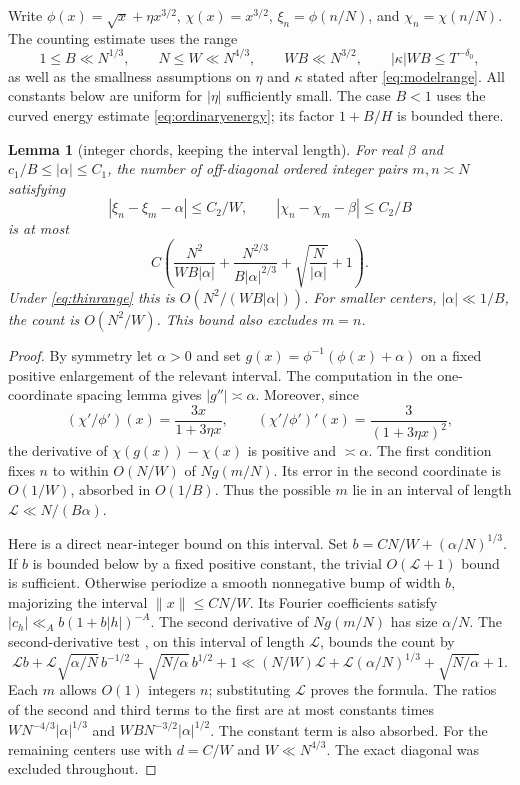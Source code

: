 \documentclass[11pt]{amsart}
\numberwithin{equation}{section}
\newtheorem{lemma}[theorem]{Lemma}
\begin{document}
Write $\phi(x)=\sqrt x+\eta x^{3/2}$, $\chi(x)=x^{3/2}$,
$\xi_n=\phi(n/N)$, and $\chi_n=\chi(n/N)$.
The counting estimate uses the range
\begin{equation}\label{eq:thinrange}
 1\le B\ll N^{1/3},\qquad N\le W\ll N^{4/3},\qquad
 WB\ll N^{3/2},\qquad |\kappa|WB\le T^{-\delta_0},
\end{equation}
as well as the smallness assumptions on $\eta$ and $\kappa$ stated after
\eqref{eq:modelrange}.
All constants below are uniform for $|\eta|$ sufficiently small.
The case $B<1$ uses the curved energy estimate
\eqref{eq:ordinaryenergy}; its factor $1+B/H$ is bounded there.

\begin{lemma}[integer chords, keeping the interval length]
\label{lem:chordreproof}
For real $\beta$ and $c_1/B\le|\alpha|\le C_1$, the number of off-diagonal ordered
integer pairs $m,n\asymp N$ satisfying
\[
 |\xi_n-\xi_m-\alpha|\le C_2/W,\qquad
 |\chi_n-\chi_m-\beta|\le C_2/B
\]
is at most
\[
 C\left(\frac{N^2}{WB|\alpha|}
       +\frac{N^{2/3}}{B|\alpha|^{2/3}}
       +\sqrt{\frac N{|\alpha|}}+1\right).
\]
Under \eqref{eq:thinrange} this is $O(N^2/(WB|\alpha|))$.
For smaller centers, $|\alpha|\ll1/B$, the count is $O(N^2/W)$.
This bound also excludes $m=n$.
\end{lemma}
\begin{proof}
By symmetry let $\alpha>0$ and set
$g(x)=\phi^{-1}(\phi(x)+\alpha)$ on a fixed positive enlargement
of the relevant interval. The computation in
the one-coordinate spacing lemma
\cite[Lemma~\ref*{six-lem:spacingproof}]{Weighted} gives $|g''|\asymp\alpha$.
Moreover, since
\[
 (\chi'/\phi')(x)=\frac{3x}{1+3\eta x},\qquad
 (\chi'/\phi')'(x)=\frac3{(1+3\eta x)^2},
\]
the derivative of $\chi(g(x))-\chi(x)$ is positive and
$\asymp\alpha$. The first condition fixes $n$ to within $O(N/W)$
of $Ng(m/N)$. Its error in the second coordinate is $O(1/W)$,
absorbed in $O(1/B)$. Thus the possible $m$ lie in an interval of
length $\mathcal L\ll N/(B\alpha)$.

Here is a direct near-integer bound on this interval. Set
$b=C N/W+(\alpha/N)^{1/3}$. If $b$ is bounded below by a fixed
positive constant, the trivial $O(\mathcal L+1)$ bound is sufficient.
Otherwise periodize a smooth nonnegative bump of width $b$, majorizing
the interval $\|x\|\le C N/W$. Its Fourier coefficients satisfy
$|c_h|\ll_A b(1+b|h|)^{-A}$. The second derivative of
$Ng(m/N)$ has size $\alpha/N$. The second-derivative test
\cite[Lemma~\ref*{six-lem:secondproof}]{Weighted}, on
this interval of length $\mathcal L$, bounds the count by
\[
 \mathcal L b+
 \mathcal L\sqrt{\alpha/N}\,b^{-1/2}
       +\sqrt{N/\alpha}\,b^{1/2}+1
 \ll (N/W)\mathcal L+\mathcal L(\alpha/N)^{1/3}
                       +\sqrt{N/\alpha}+1.
\]
Each $m$ allows $O(1)$ integers $n$; substituting $\mathcal L$ proves
the formula. The ratios of the second and third terms to the first
are at most constants times
$WN^{-4/3}|\alpha|^{1/3}$ and
$WBN^{-3/2}|\alpha|^{1/2}$. The constant term is also absorbed.
For the remaining centers use
\cite[Lemma~\ref*{six-lem:spacingproof}]{Weighted} with
$d=C/W$ and $W\ll N^{4/3}$. The exact diagonal was excluded throughout.
\end{proof}
\end{document}
